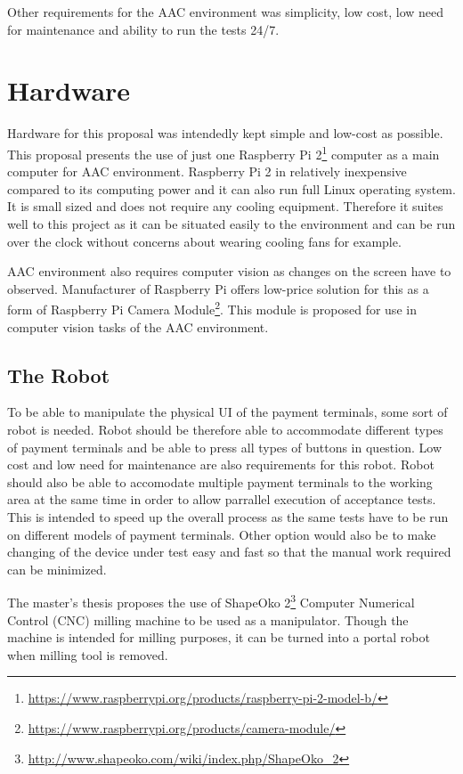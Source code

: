 Other requirements for the AAC environment was simplicity, low cost, low need for maintenance and ability to run the tests 24/7.

\section{Hardware}
\label{section:Proposed hardware}

Hardware for this proposal was intendedly kept simple and low-cost as possible. This proposal presents the use of just one Raspberry Pi 2\footnote{\url{https://www.raspberrypi.org/products/raspberry-pi-2-model-b/}} computer as a main computer for AAC environment. Raspberry Pi 2 in relatively inexpensive compared to its computing power and it can also run full Linux operating system. It is small sized and does not require any cooling equipment. Therefore it suites well to this project as it can be situated easily to the environment and can be run over the clock without concerns about wearing cooling fans for example.

AAC environment also requires computer vision as changes on the screen have to observed. Manufacturer of Raspberry Pi offers low-price solution for this as a form of Raspberry Pi Camera Module\footnote{\url{https://www.raspberrypi.org/products/camera-module/}}. This module is proposed for use in computer vision tasks of the AAC environment.

\FloatBarrier
\subsection{The Robot}
\label{subsection:The Robot proposal}

To be able to manipulate the physical UI of the payment terminals, some sort of robot is needed. Robot should be therefore able to accommodate different types of payment terminals and be able to press all types of buttons in question. Low cost and low need for maintenance are also requirements for this robot. Robot should also be able to accomodate multiple payment terminals to the working area at the same time in order to allow parrallel execution of acceptance tests. This is intended to speed up the overall process as the same tests have to be run on different models of payment terminals. Other option would also be to make changing of the device under test easy and fast so that the manual work required can be minimized.

The master's thesis proposes the use of ShapeOko 2\footnote{\url{http://www.shapeoko.com/wiki/index.php/ShapeOko_2}} Computer Numerical Control (CNC) milling machine to be used as a manipulator. Though the machine is intended for milling purposes, it can be turned into a portal robot when milling tool is removed.

